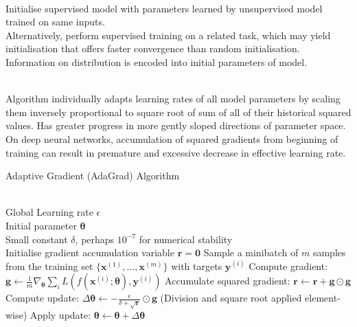 \begin{remark} \\
Initialise supervised model with parameters learned by unsupervised model trained on same inputs.\\
Alternatively, perform supervised training on a related task, which may yield initialisation that offers faster convergence than random initialisation. Information on distribution is encoded into initial parameters of model.
\end{remark}

\begin{remark} \\
Algorithm individually adapts learning rates of all model parameters by scaling them inversely proportional to square root of sum of all of their historical squared values. Has greater progress in more gently sloped directions of parameter space. On deep neural networks, accumulation of squared gradients from beginning of training can result in premature and excessive decrease in effective learning rate.
\end{remark}

\begin{breakablealgorithm}
\caption{Adaptive Gradient (AdaGrad) Algorithm}
\begin{algorithmic}
\Require \\
Global Learning rate $\epsilon$\\
Initial parameter $\bm{\theta}$\\
Small constant $\delta$, perhaps $10^{-7}$ for numerical stability\\

\State Initialise gradient accumulation variable $\bm{r} = \bm{0}$
\State Sample a minibatch of $m$ samples from the training set $\{\bm{x}^{(1)}, \ldots, \bm{x}^{(m)} \}$ with targets $\bm{y}^{(i)}$
\State Compute gradient: $\bm{g} \leftarrow \frac{1}{m} \nabla_{\bm{\theta}} \sum_i L(f(\bm{x}^{(i)}; \bm{\theta}), \bm{y}^{(i)})$
\State Accumulate squared gradient: $\bm{r} \leftarrow \bm{r} + \bm{g} \odot \bm{g}$
\State Compute update: $\Delta \bm{\theta} \leftarrow - \frac{\epsilon}{\delta + \sqrt{\bm{r}}} \odot \bm{g}$ (Division and square root applied element-wise)
\State Apply update: $\bm{\theta} \leftarrow \bm{\theta} + \Delta \bm{\theta}$
\EndWhile
\end{algorithmic}
\end{breakablealgorithm}

